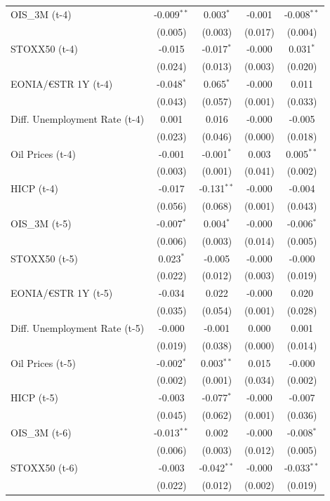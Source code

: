 \begin{longtable}[t]{lcccc}
OIS\_3M (t-4) & -0.009$^{**}$ & 0.003$^{*}$ & -0.001 & -0.008$^{**}$\\
 & (0.005) & (0.003) & (0.017) & (0.004)\\
STOXX50 (t-4) & -0.015 & -0.017$^{*}$ & -0.000 & 0.031$^{*}$\\
 & (0.024) & (0.013) & (0.003) & (0.020)\\
EONIA/€STR 1Y (t-4) & -0.048$^{*}$ & 0.065$^{*}$ & -0.000 & 0.011\\
 & (0.043) & (0.057) & (0.001) & (0.033)\\
Diff. Unemployment Rate (t-4) & 0.001 & 0.016 & -0.000 & -0.005\\
 & (0.023) & (0.046) & (0.000) & (0.018)\\
Oil Prices (t-4) & -0.001 & -0.001$^{*}$ & 0.003 & 0.005$^{**}$\\
 & (0.003) & (0.001) & (0.041) & (0.002)\\
HICP (t-4) & -0.017 & -0.131$^{**}$ & -0.000 & -0.004\\
 & (0.056) & (0.068) & (0.001) & (0.043)\\
OIS\_3M (t-5) & -0.007$^{*}$ & 0.004$^{*}$ & -0.000 & -0.006$^{*}$\\
 & (0.006) & (0.003) & (0.014) & (0.005)\\
STOXX50 (t-5) & 0.023$^{*}$ & -0.005 & -0.000 & -0.000\\
 & (0.022) & (0.012) & (0.003) & (0.019)\\
EONIA/€STR 1Y (t-5) & -0.034 & 0.022 & -0.000 & 0.020\\
 & (0.035) & (0.054) & (0.001) & (0.028)\\
Diff. Unemployment Rate (t-5) & -0.000 & -0.001 & 0.000 & 0.001\\
 & (0.019) & (0.038) & (0.000) & (0.014)\\
Oil Prices (t-5) & -0.002$^{*}$ & 0.003$^{**}$ & 0.015 & -0.000\\
 & (0.002) & (0.001) & (0.034) & (0.002)\\
HICP (t-5) & -0.003 & -0.077$^{*}$ & -0.000 & -0.007\\
 & (0.045) & (0.062) & (0.001) & (0.036)\\
OIS\_3M (t-6) & -0.013$^{**}$ & 0.002 & -0.000 & -0.008$^{*}$\\
 & (0.006) & (0.003) & (0.012) & (0.005)\\
STOXX50 (t-6) & -0.003 & -0.042$^{**}$ & -0.000 & -0.033$^{**}$\\
 & (0.022) & (0.012) & (0.002) & (0.019)\\

\end{longtable}
